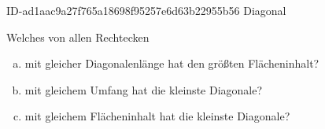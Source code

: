 \begin{exercise}
      {ID-ad1aac9a27f765a18698f95257e6d63b22955b56}
      {Diagonal}
  \ifproblem\problem\par
    Welches von allen Rechtecken
    \begin{enumerate}[a)]
      \item mit gleicher Diagonalenlänge hat den größten Flächeninhalt?
      \item mit gleichem Umfang hat die kleinste Diagonale?
      \item mit gleichem Flächeninhalt hat die kleinste Diagonale?
    \end{enumerate}
  \fi
\end{exercise}
